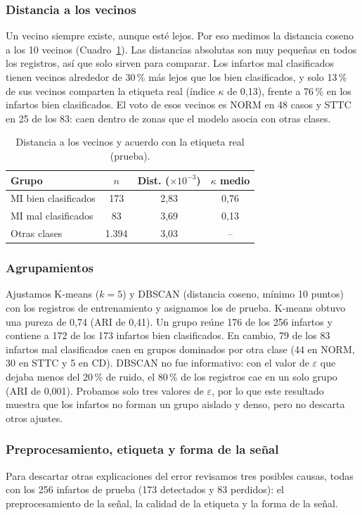 \documentclass[conference]{IEEEtran}
\begin{document}
\subsubsection{Distancia a los vecinos}
Un vecino siempre existe, aunque esté lejos. Por eso medimos la distancia coseno a los 10 vecinos (Cuadro~\ref{tab:vecinos}). Las distancias absolutas son muy pequeñas en todos los registros, así que solo sirven para comparar. Los infartos mal clasificados tienen vecinos alrededor de 30\,\% más lejos que los bien clasificados, y solo 13\,\% de sus vecinos comparten la etiqueta real (índice $\kappa$ de 0,13), frente a 76\,\% en los infartos bien clasificados. El voto de esos vecinos es NORM en 48 casos y STTC en 25 de los 83: caen dentro de zonas que el modelo asocia con otras clases.

\begin{table}[t]
\caption{Distancia a los vecinos y acuerdo con la etiqueta real (prueba).}
\label{tab:vecinos}
\centering\footnotesize\setlength{\tabcolsep}{3pt}
\begin{tabular}{@{}lccc@{}}
\toprule
Grupo & $n$ & Dist. ($\times10^{-3}$) & $\kappa$ medio \\
\midrule
MI bien clasificados & 173 & 2,83 & 0,76 \\
MI mal clasificados & 83 & 3,69 & 0,13 \\
Otras clases & 1.394 & 3,03 & -- \\
\bottomrule
\end{tabular}
\end{table}

\subsubsection{Agrupamientos}
Ajustamos K-means ($k=5$) y DBSCAN (distancia coseno, mínimo 10 puntos) con los registros de entrenamiento y asignamos los de prueba. K-means obtuvo una pureza de 0,74 (ARI de 0,41). Un grupo reúne 176 de los 256 infartos y contiene a 172 de los 173 infartos bien clasificados. En cambio, 79 de los 83 infartos mal clasificados caen en grupos dominados por otra clase (44 en NORM, 30 en STTC y 5 en CD). DBSCAN no fue informativo: con el valor de $\varepsilon$ que dejaba menos del 20\,\% de ruido, el 80\,\% de los registros cae en un solo grupo (ARI de 0,001). Probamos solo tres valores de $\varepsilon$, por lo que este resultado muestra que los infartos no forman un grupo aislado y denso, pero no descarta otros ajustes.

\subsubsection{Preprocesamiento, etiqueta y forma de la señal}
Para descartar otras explicaciones del error revisamos tres posibles causas, todas con los 256 infartos de prueba (173 detectados y 83 perdidos): el preprocesamiento de la señal, la calidad de la etiqueta y la forma de la señal.
\end{document}
